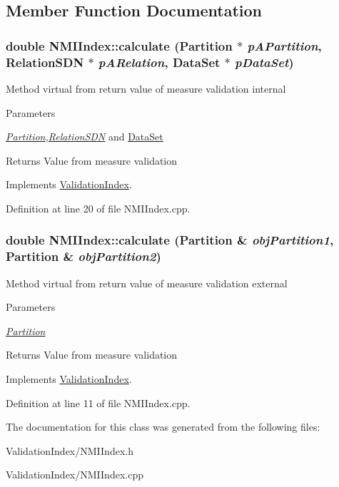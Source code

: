 \subsection{Member Function Documentation}
\hypertarget{classNMIIndex_a930fb32a05cbba0f427510536c204694}{
\subsubsection[{calculate}]{\setlength{\rightskip}{0pt plus 5cm}double NMIIndex::calculate ({\bf Partition} $\ast$ {\em pAPartition}, \/  {\bf RelationSDN} $\ast$ {\em pARelation}, \/  {\bf DataSet} $\ast$ {\em pDataSet})}}
\label{classNMIIndex_a930fb32a05cbba0f427510536c204694}
Method virtual from return value of measure validation internal 
\begin{DoxyParams}{Parameters}
\item[{\em \hyperlink{classPartition}{Partition},\hyperlink{classRelationSDN}{RelationSDN}}]and \hyperlink{classDataSet}{DataSet} \end{DoxyParams}
\begin{DoxyReturn}{Returns}
Value from measure validation 
\end{DoxyReturn}


Implements \hyperlink{classValidationIndex_a26fe1244f3313bd7f557149f6846fe01}{ValidationIndex}.

Definition at line 20 of file NMIIndex.cpp.\hypertarget{classNMIIndex_a3d2c254720bd825119d1cd7905daa50f}{
\subsubsection[{calculate}]{\setlength{\rightskip}{0pt plus 5cm}double NMIIndex::calculate ({\bf Partition} \& {\em objPartition1}, \/  {\bf Partition} \& {\em objPartition2})}}
\label{classNMIIndex_a3d2c254720bd825119d1cd7905daa50f}
Method virtual from return value of measure validation external 
\begin{DoxyParams}{Parameters}
\item[{\em \hyperlink{classPartition}{Partition}}]\end{DoxyParams}
\begin{DoxyReturn}{Returns}
Value from measure validation 
\end{DoxyReturn}


Implements \hyperlink{classValidationIndex_a8b688d8d53fbdacec393730fe2bab614}{ValidationIndex}.

Definition at line 11 of file NMIIndex.cpp.

The documentation for this class was generated from the following files:\begin{DoxyCompactItemize}
\item 
ValidationIndex/NMIIndex.h\item 
ValidationIndex/NMIIndex.cpp\end{DoxyCompactItemize}
